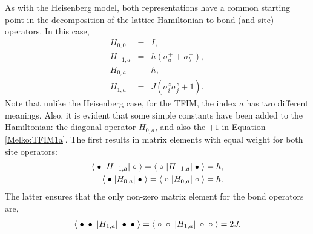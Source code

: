 \documentclass[vecphys]{svmult}
\begin{document}
As with the Heisenberg model, both representations have a common starting point in the decomposition of the lattice Hamiltonian to bond (and site) operators.  In this case, 
\begin{eqnarray}
H_{0,0} &=& I, \label {Melko:TFIM00} \\
H_{-1,a} &=& h(\sigma^+_a + \sigma^-_b), \label{Melko:TFIM-1a} \\
H_{0,a} &=& h, \\
H_{1,a} &=& J (\sigma^z_i \sigma^z_j + 1).  \label{Melko:TFIM1a}
\end{eqnarray}
Note that unlike the Heisenberg case, for the TFIM, the index $a$ has two different meanings.  Also, it is evident that some simple constants have been added to the Hamiltonian:  the diagonal operator $H_{0,a}$, and also the $+1$ in Equation \ref{Melko:TFIM1a}.  The first results in matrix elements with equal weight for both site operators:
\begin{eqnarray}
\langle \hspace{1mm} \bullet \hspace{1mm}  | H_{-1,a} |\hspace{1mm} \circ \hspace{1mm} \rangle = 
\langle \hspace{1mm} \circ \hspace{1mm}  | H_{-1,a} |\hspace{1mm} \bullet \hspace{1mm} \rangle = h,  \\
\langle \hspace{1mm}  \bullet \hspace{1mm}  | H_{0,a} | \hspace{1mm} \bullet \hspace{1mm} \rangle = 
\langle \hspace{1mm}  \circ \hspace{1mm}  | H_{0,a} | \hspace{1mm} \circ \hspace{1mm} \rangle = h. 
\end{eqnarray} 
The latter ensures that the only non-zero matrix element for the bond operators are,
\begin{eqnarray}
\langle \hspace{1mm} \bullet \hspace{1mm}  \bullet \hspace{1mm}  | H_{1,a} | \hspace{1mm} \bullet \hspace{1mm} \bullet \hspace{1mm} \rangle = 
\langle \hspace{1mm} \circ \hspace{1mm}  \circ \hspace{1mm}  | H_{1,a} | \hspace{1mm} \circ \hspace{1mm} \circ \hspace{1mm} \rangle = 2J. 
\end{eqnarray}
\end{document}
